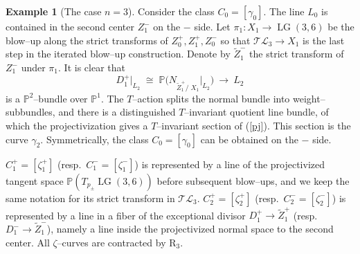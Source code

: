 \documentclass[10pt]{amsart}
\theoremstyle{definition}
\newtheorem{example}[theorem]{Example}
\newcommand{\OO}{\mathcal{O}}
\newcommand{\LG}{\operatorname{LG}}
\newcommand{\TL}{\mathcal{TL}}
\newcommand{\PP}{\mathbb{P}}
\newcommand{\RL}{\mathrm{R}}
\theoremstyle{plain} %
\begin{document}
\begin{example}[The case $n=3$]
Consider the class $C_0=[\gamma_0]$. The line $L_0$ is contained in the second center $Z_1^-$ on the $-$ side. Let $\pi_1\colon X_1\rightarrow\LG(3,6)$ be the blow--up along the strict transforms of $Z_0^+,Z_1^+,Z_0^-$ so that $\TL_3\rightarrow X_1$ is the last step in the iterated blow--up construction. Denote by $\widetilde Z_1^-$ the strict transform of $Z_1^-$ under $\pi_1$. 
It is clear that
\begin{equation}\label{pj}
D_1^+|_{L_2}
\;\cong\;\PP\bigl(N_{\widetilde Z_1^+/\;X_1}\big|_{L_2}\bigr)\ \longrightarrow\ L_2 
\end{equation}
is a $\mathbb P^2$--bundle over $\mathbb P^1$. The $T$--action splits the normal bundle
into weight--subbundles, and there is a distinguished $T$--invariant quotient line bundle, of which the projectivization gives a $T$--invariant section of (\ref{pj}).
This section is the curve $\gamma_2$. 
Symmetrically, the class $C_0=[\gamma_0]$ can be obtained on the $-$ side.

$C_1^+=[\zeta_1^+]$ (resp.\ $C_1^-=[\zeta_1^-]$) is represented by a line of the projectivized tangent space $\PP(T_{p_\pm}\LG(3,6))$ before subsequent blow--ups, and we keep the same notation for its strict transform in $\TL_3$. $C_2^+=[\zeta_2^+]$ (resp.\ $C_2^-=[\zeta_2^-]$) is represented by a line in a fiber
of the exceptional divisor $D_1^+\to \widetilde Z_1^+$ (resp.\ $D_1^-\to \widetilde Z_1^-$), namely a line inside the projectivized normal space to the second center. All $\zeta$--curves are contracted by $\RL_3$.


\end{example}
\end{document}

